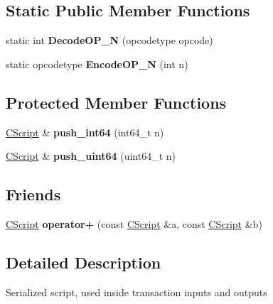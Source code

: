 \subsection*{Static Public Member Functions}
\begin{DoxyCompactItemize}
\item 
\mbox{\label{class_c_script_a7f975fca06b3e9a17da8ba23c7647e2e}} 
static int {\bfseries Decode\+O\+P\+\_\+N} (opcodetype opcode)
\item 
\mbox{\label{class_c_script_ae81b29e2e86343bedacfd4e0ef87bca6}} 
static opcodetype {\bfseries Encode\+O\+P\+\_\+N} (int n)
\end{DoxyCompactItemize}
\subsection*{Protected Member Functions}
\begin{DoxyCompactItemize}
\item 
\mbox{\label{class_c_script_ad802105f1515b4953ecbe6aeab2ee1ca}} 
\mbox{\hyperlink{class_c_script}{C\+Script}} \& {\bfseries push\+\_\+int64} (int64\+\_\+t n)
\item 
\mbox{\label{class_c_script_adeadab761c1952847ba0d1b0b1011e16}} 
\mbox{\hyperlink{class_c_script}{C\+Script}} \& {\bfseries push\+\_\+uint64} (uint64\+\_\+t n)
\end{DoxyCompactItemize}
\subsection*{Friends}
\begin{DoxyCompactItemize}
\item 
\mbox{\label{class_c_script_a533d7ad1fc14f689b3aec7d7af7800ee}} 
\mbox{\hyperlink{class_c_script}{C\+Script}} {\bfseries operator+} (const \mbox{\hyperlink{class_c_script}{C\+Script}} \&a, const \mbox{\hyperlink{class_c_script}{C\+Script}} \&b)
\end{DoxyCompactItemize}


\subsection{Detailed Description}
Serialized script, used inside transaction inputs and outputs 

